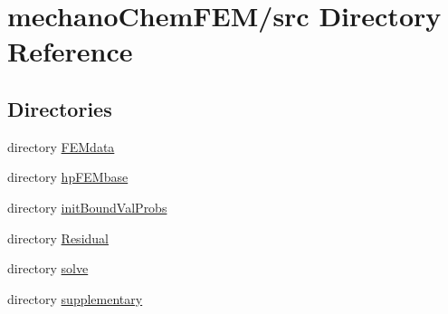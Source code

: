 \section{mechano\-Chem\-F\-E\-M/src Directory Reference}
\label{dir_e7c0b4afef660b0a3039c755da59c894}
\subsection*{Directories}
\begin{DoxyCompactItemize}
\item 
directory \hyperlink{dir_97da76cb69d6b32226d05cfade0f3c97}{F\-E\-Mdata}
\item 
directory \hyperlink{dir_6058f7ae2cdf4074eeec280bbf56691a}{hp\-F\-E\-Mbase}
\item 
directory \hyperlink{dir_0492cce411d358cb2973b5739a19c688}{init\-Bound\-Val\-Probs}
\item 
directory \hyperlink{dir_80fe6afb1de6555e90cf2af09e5d7764}{Residual}
\item 
directory \hyperlink{dir_42e9ed0f2b1521169717a931c6f25fb9}{solve}
\item 
directory \hyperlink{dir_e1d5aedda1ba5663936034ac1d492cd1}{supplementary}
\end{DoxyCompactItemize}
